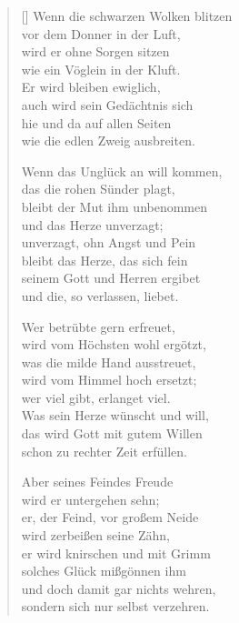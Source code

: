 \begin{multicols}{2}
\begin{verse}[\versewidth]
 Wenn die schwarzen Wolken blitzen\\
vor dem Donner in der Luft,\\
wird er ohne Sorgen sitzen\\
wie ein Vöglein in der Kluft.\\
Er wird bleiben ewiglich,\\
auch wird sein Gedächtnis sich\\
hie und da auf allen Seiten\\
wie die edlen Zweig ausbreiten.

 Wenn das Unglück an will kommen,\\
das die rohen Sünder plagt,\\
bleibt der Mut ihm unbenommen\\
und das Herze unverzagt;\\
unverzagt, ohn Angst und Pein\\
bleibt das Herze, das sich fein\\
seinem Gott und Herren ergibet\\
und die, so verlassen, liebet.

 Wer betrübte gern erfreuet,\\
wird vom Höchsten wohl ergötzt,\\
was die milde Hand ausstreuet,\\
wird vom Himmel hoch ersetzt;\\
wer viel gibt, erlanget viel.\\
Was sein Herze wünscht und will,\\
das wird Gott mit gutem Willen\\
schon zu rechter Zeit erfüllen.

 Aber seines Feindes Freude\\
wird er untergehen sehn;\\
er, der Feind, vor großem Neide\\
wird zerbeißen seine Zähn,\\
er wird knirschen und mit Grimm\\
solches Glück mißgönnen ihm\\
und doch damit gar nichts wehren,\\
sondern sich nur selbst verzehren.

\end{verse}
\end{multicols}
